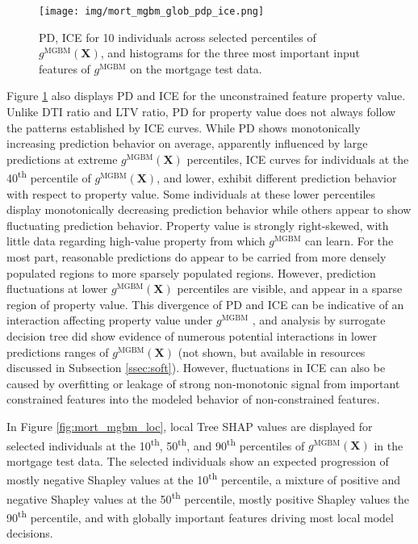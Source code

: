 \documentclass[information,article,submit,moreauthors,pdftex]{definitions/mdpi}
\begin{document}
\begin{figure}[H]
\centering
\texttt{[image: img/mort\_mgbm\_glob\_pdp\_ice.png]}
\caption{PD, ICE for 10 individuals across selected percentiles of $g^\text{MGBM}(\mathbf{X})$, and histograms for the three most important input features of $g^\text{MGBM}$ on the mortgage test data.}
\label{fig:mort_mgbm_glob_pdp_ice}
\end{figure}   

Figure \ref{fig:mort_mgbm_glob_pdp_ice} also displays PD and ICE for the unconstrained feature property value. Unlike DTI ratio and LTV ratio, PD for property value does not always follow the patterns established by ICE curves. While PD shows monotonically increasing prediction behavior on average, apparently influenced by large predictions at extreme $g^{\text{MGBM}}(\mathbf{X})$ percentiles, ICE curves for individuals at the 40\textsuperscript{th} percentile of $g^{\text{MGBM}}(\mathbf{X})$, and lower,  exhibit different prediction behavior with respect to property value. Some individuals at these lower percentiles display monotonically decreasing prediction behavior while others appear to show fluctuating prediction behavior. Property value is strongly right-skewed, with little data regarding high-value property from which $g^{\text{MGBM}}$ can learn. For the most part, reasonable predictions do appear to be carried from more densely populated regions to more sparsely populated regions. However, prediction fluctuations at lower $g^{\text{MGBM}}(\mathbf{X})$ percentiles are visible, and appear in a sparse region of property value. This divergence of PD and ICE can be indicative of an interaction affecting property value under $g^{\text{MGBM}}$ \cite{ice_plots}, and analysis by surrogate decision tree did show evidence of numerous potential interactions in lower predictions ranges of $g^{\text{MGBM}}(\mathbf{X})$ \cite{art_and_sci} (not shown, but available in resources discussed in Subsection \ref{ssec:soft}). However, fluctuations in ICE can also be caused by overfitting or leakage of strong non-monotonic signal from important constrained features into the modeled behavior of non-constrained features. 

In Figure \ref{fig:mort_mgbm_loc}, local Tree SHAP values are displayed for selected individuals at the 10\textsuperscript{th}, 50\textsuperscript{th}, and 90\textsuperscript{th} percentiles of $g^{\text{MGBM}}(\mathbf{X})$ in the mortgage test data. The selected individuals show an expected progression of mostly negative Shapley values at the 10\textsuperscript{th} percentile, a mixture of positive and negative Shapley values at the 50\textsuperscript{th} percentile, mostly positive Shapley values the 90\textsuperscript{th} percentile, and with globally important features driving most local model decisions. 
\end{document}
